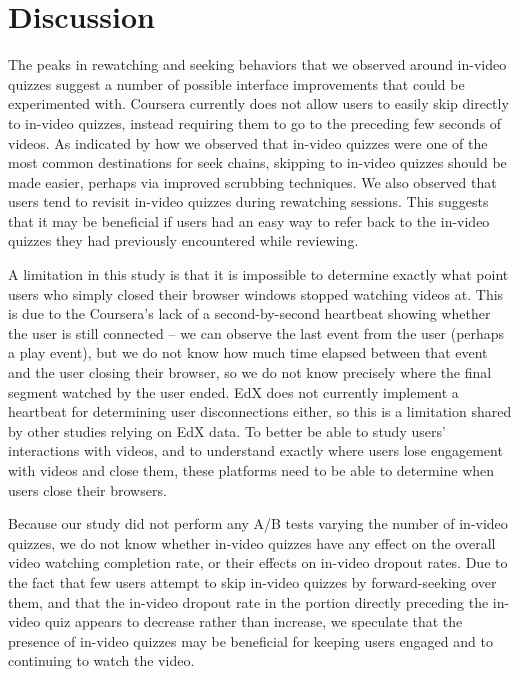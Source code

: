 \documentclass[letterpaper]{article}
\begin{document}
\section{Discussion}

The peaks in rewatching and seeking behaviors that we observed around in-video quizzes suggest a number of possible interface improvements that could be experimented with. Coursera currently does not allow users to easily skip directly to in-video quizzes, instead requiring them to go to the preceding few seconds of videos. As indicated by how we observed that in-video quizzes were one of the most common destinations for seek chains, skipping to in-video quizzes should  be made easier, perhaps via improved scrubbing techniques. We also observed that users tend to revisit in-video quizzes during rewatching sessions. This suggests that it may be beneficial if users had an easy way to refer back to the in-video quizzes they had previously encountered while reviewing.

A limitation in this study is that it is impossible to determine exactly what point users who simply closed their browser windows stopped watching videos at. This is due to the Coursera's lack of a second-by-second heartbeat showing whether the user is still connected -- we can observe the last event from the user (perhaps a play event), but we do not know how much time elapsed between that event and the user closing their browser, so we do not know precisely where the final segment watched by the user ended. EdX does not currently implement a heartbeat for determining user disconnections either, so this is a limitation shared by other studies relying on EdX data. To better be able to study users' interactions with videos, and to understand exactly where users lose engagement with videos and close them, these platforms need to be able to determine when users close their browsers.

Because our study did not perform any A/B tests varying the number of in-video quizzes, we do not know whether in-video quizzes have any effect on the overall video watching completion rate, or their effects on in-video dropout rates. Due to the fact that few users attempt to skip in-video quizzes by forward-seeking over them, and that the in-video dropout rate in the portion directly preceding the in-video quiz appears to decrease rather than increase, we speculate that the presence of in-video quizzes may be beneficial for keeping users engaged and to continuing to watch the video.
\end{document}
